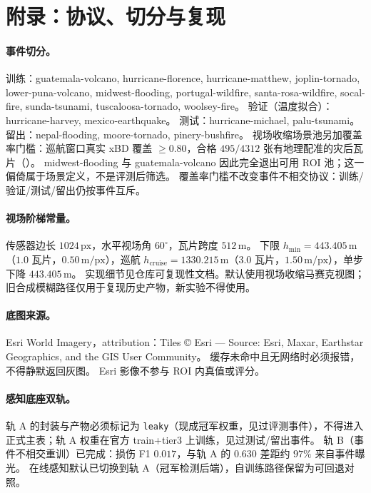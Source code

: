 \section{附录：协议、切分与复现}
\label{sec:appendix}

\paragraph{事件切分。}
训练：guatemala-volcano, hurricane-florence, hurricane-matthew, joplin-tornado, lower-puna-volcano, midwest-flooding, portugal-wildfire, santa-rosa-wildfire, socal-fire, sunda-tsunami, tuscaloosa-tornado, woolsey-fire。
验证（温度拟合）：hurricane-harvey, mexico-earthquake。
测试：hurricane-michael, palu-tsunami。
留出：nepal-flooding, moore-tornado, pinery-bushfire。
视场收缩场景池另加覆盖率门槛：巡航窗口真实 xBD 覆盖 $\ge 0.80$，合格 $495/4312$ 张有地理配准的灾后瓦片（）。
midwest-flooding 与 guatemala-volcano 因此完全退出可用 ROI 池；这一偏倚属于场景定义，不是评测后筛选。
覆盖率门槛不改变事件不相交协议：训练/验证/测试/留出仍按事件互斥。

\paragraph{视场阶梯常量。}
传感器边长 $1024\,\mathrm{px}$，水平视场角 $60^\circ$，瓦片跨度 $512\,\mathrm{m}$。
下限 $h_{\min}=443.405\,\mathrm{m}$（$1.0$ 瓦片，$0.50\,\mathrm{m/px}$），巡航 $h_{\mathrm{cruise}}=1330.215\,\mathrm{m}$（$3.0$ 瓦片，$1.50\,\mathrm{m/px}$），单步下降 $443.405\,\mathrm{m}$。
实现细节见仓库可复现性文档。默认使用视场收缩马赛克视图；旧合成模糊路径仅用于复现历史产物，新实验不得使用。

\paragraph{底图来源。}
Esri World Imagery，attribution：Tiles © Esri — Source: Esri, Maxar, Earthstar Geographics, and the GIS User Community。
缓存未命中且无网络时必须报错，不得静默返回灰图。
Esri 影像不参与 ROI 内真值或评分。

\paragraph{感知底座双轨。}
轨 A 的封装与产物必须标记为 \texttt{leaky}（现成冠军权重，见过评测事件），不得进入正式主表；轨 A 权重在官方 train+tier3 上训练，见过测试/留出事件。
轨 B（事件不相交重训）已完成：损伤 F1 $0.017$，与轨 A 的 $0.630$ 差距约 $97\%$ 来自事件曝光。
在线感知默认已切换到轨 A（冠军检测后端），自训练路径保留为可回退对照。

